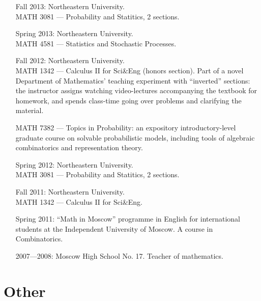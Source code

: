 \documentclass[letterpaper,11pt]{article}
\begin{document}
\begin{itemize}
  \item[Fall 2013:]   
  Northeastern University. \\
  MATH 3081 --- 
  Probability and Statitics, 2 sections.
  \item[Spring 2013:] 
  Northeastern University. 
  \\
  MATH 4581 --- Statistics and Stochastic Processes.
  \item[Fall 2012:]
  Northeastern University. 
  \\
  MATH 1342 --- 
  Calculus II for Sci\&Eng (honors section). Part of a novel Department of Mathematics' teaching experiment with ``inverted'' sections: the instructor assigns watching video-lectures accompanying the textbook for homework, and spends class-time going over problems and clarifying the material.

  MATH 7382 --- Topics in Probability: an expository introductory-level graduate course on solvable probabilistic models, including tools of algebraic combinatorics and representation theory.

  \item[Spring 2012:] 
  Northeastern University. \\
  MATH 3081 --- 
  Probability and Statitics, 2 sections.
  \item[Fall 2011:]
  Northeastern University.\\
  MATH 1342 --- 
  Calculus II for Sci\&Eng.
  \item[Spring 2011:]
  ``Math in Moscow'' programme in English for international students at the Independent University of Moscow. A course in Combinatorics.

  \item[2007---2008:]
  Moscow High School No. 17.
  Teacher of mathematics.
\end{itemize}

\section*{Other}
\end{document}
